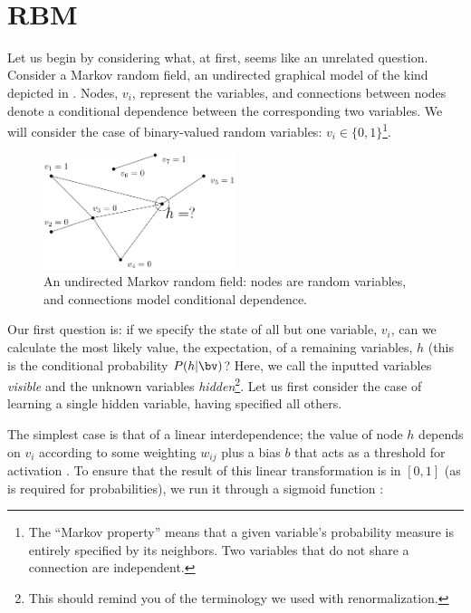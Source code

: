 \

\section{RBM}
Let us begin by considering what, at first, seems like an unrelated
question. Consider a Markov random field, an undirected graphical
model of the kind depicted in . Nodes,
$v_i$, represent the variables, and connections between nodes denote a
conditional dependence between the corresponding two variables. We
will consider the case of binary-valued random variables:
$v_i \in \{0,1\}$\footnote{The ``Markov property'' means that a given
  variable's probability measure is entirely specified by its
  neighbors. Two variables that do not share a connection are independent.}.

\begin{figure}[ht]
  \centering
  \includegraphics[width=0.5\textwidth]{figures/markov-random-field.png}
  \caption{An undirected Markov random field: nodes are random
    variables, and connections model conditional
    dependence.\label{fig:markov-random-field} }
\end{figure}

Our first question is: if we specify the state of all but one
variable, $v_i$, can we calculate the most likely value, the
expectation, of a remaining variables, $h$ (this is the conditional
probability $P(h|\bv)$? Here, we call the inputted variables
\textit{visible} and the unknown variables
\textit{hidden}\footnote{This should remind you of the terminology we
  used with renormalization.}. Let us first consider the case of
learning a single hidden variable, having specified all others.

The simplest case is that of a linear interdependence; the value of
node $h$ depends on $v_i$ according to some weighting $w_{ij}$ plus a
bias $b$ that acts as a threshold for activation
. To ensure that the result of this linear
transformation is in $[0,1]$ (as is required for probabilities), we
run it through a sigmoid function :

